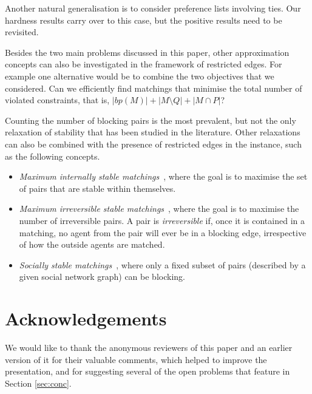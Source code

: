 \documentclass[preprint,12pt]{elsarticle}
\begin{document}
Another natural generalisation is to consider preference lists involving ties. Our hardness results carry over to this case, but the positive results need to be revisited.

Besides the two main problems discussed in this paper, other approximation concepts can also be investigated in the framework of restricted edges.  For example one alternative would be to combine the two objectives that we considered.  Can we efficiently find matchings that minimise the total number of violated constraints, that is, $|bp(M)| + |M \setminus Q| + |M \cap P|$?

Counting the number of blocking pairs is the most prevalent, but not the only relaxation of stability that has been studied in the literature. Other relaxations can also be combined with the presence of restricted edges in the instance, such as the following concepts.
\begin{itemize}
 \item \emph{Maximum internally stable matchings}~\cite{Tan90}, where the goal is to maximise the set of pairs that are stable within themselves. 
 \item \emph{Maximum irreversible stable matchings}~\cite{BIM16}, where the goal is to maximise the number of irreversible pairs. A pair is \emph{irreversible} if, once it is contained in a matching, no agent from the pair will ever be in a blocking edge, irrespective of how the outside agents are matched.
 \item \emph{Socially stable matchings}~\cite{AIKMP13}, where only a fixed subset of pairs (described by a given social network graph) can be blocking.
\end{itemize}

\section*{Acknowledgements}
We would like to thank the anonymous reviewers of this paper and an earlier version of it for their valuable comments, which helped to improve the presentation, and for suggesting several of the open problems that feature in Section \ref{sec:conc}.

 
\end{document}
